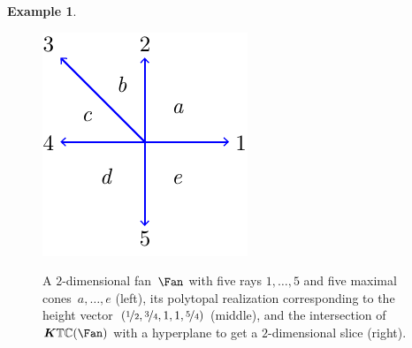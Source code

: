 \documentclass{amsart}
\theoremstyle{definition}
\newtheorem{example}[theorem]{Example}
\renewcommand{\b}[1]{{\boldsymbol{#1}}} %
\newcommand{\typeCone}{\mathbb{TC}} %
\begin{document}
\begin{example}
\label{exm:typeCone}
\begin{figure}[b]
	\capstart
	\centerline{{\includegraphics[scale=1]{typeConeFan}}  \quad {}}
	\caption{A $2$-dimensional fan~$\Fan$ with five rays $1, \dots, 5$ and five maximal cones~$a, \dots, e$ (left), its polytopal realization corresponding to the height vector~$(\nicefrac{1}{2}, \nicefrac{3}{4}, 1, 1, \nicefrac{5}{4})$ (middle), and the intersection of $\b{K}\typeCone(\Fan)$ with a hyperplane to get a $2$-dimensional slice (right).}

\end{figure}
\end{example}
\end{document}
